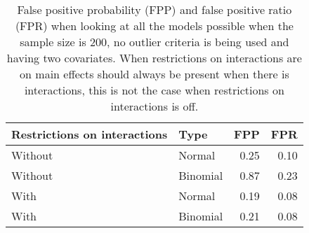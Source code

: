 \begin{longtable}{llrr}
\caption{False positive probability (FPP) and false positive ratio (FPR) when looking at all the models possible when the sample size is 200, no outlier criteria is being used and having two covariates. When restrictions on interactions are on main effects should always be present when there is interactions, this is not the case when restrictions on interactions is off.} 
\label{tab:resultFull}
  \hline
Restrictions on interactions & Type & FPP & FPR \\ 
  \hline
Without & Normal & 0.25 & 0.10 \\ 
  Without & Binomial & 0.87 & 0.23 \\ 
  With & Normal & 0.19 & 0.08 \\ 
  With & Binomial & 0.21 & 0.08 \\ 
   \hline
\hline
\end{longtable}

